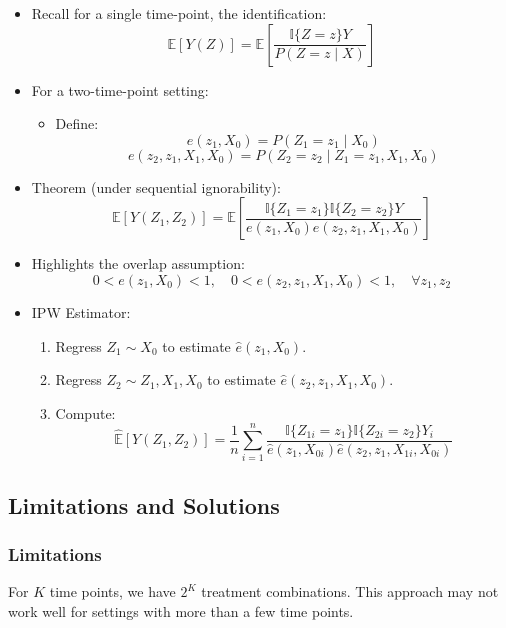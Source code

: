 \begin{itemize}
    \item Recall for a single time-point, the identification:
    \[
    \mathbb{E}[Y(Z)] = \mathbb{E}\left[\frac{\mathbb{I}\{Z = z\} Y}{P(Z = z \mid X)}\right]
    \]

    \item For a two-time-point setting:
    \begin{itemize}
        \item Define:
        \[
        e(z_1, X_0) = P(Z_1 = z_1 \mid X_0)
        \]
        \[
        e(z_2, z_1, X_1, X_0) = P(Z_2 = z_2 \mid Z_1 = z_1, X_1, X_0)
        \]
    \end{itemize}

    \item Theorem (under sequential ignorability):
    \[
    \mathbb{E}[Y(Z_1, Z_2)] = \mathbb{E}\left[\frac{\mathbb{I}\{Z_1 = z_1\} \mathbb{I}\{Z_2 = z_2\} Y}{e(z_1, X_0) e(z_2, z_1, X_1, X_0)}\right]
    \]

    \item Highlights the overlap assumption:
    \[
    0 < e(z_1, X_0) < 1, \quad 0 < e(z_2, z_1, X_1, X_0) < 1, \quad \forall z_1, z_2
    \]

    \item IPW Estimator:
    \begin{enumerate}
        \item Regress $Z_1 \sim X_0$ to estimate $\hat{e}(z_1, X_0)$.
        \item Regress $Z_2 \sim Z_1, X_1, X_0$ to estimate $\hat{e}(z_2, z_1, X_1, X_0)$.
        \item Compute:
        \[
        \widehat{\mathbb{E}}[Y(Z_1, Z_2)] = \frac{1}{n} \sum_{i=1}^n \frac{\mathbb{I}\{Z_{1i} = z_1\} \mathbb{I}\{Z_{2i} = z_2\} Y_i}{\hat{e}(z_1, X_{0i}) \hat{e}(z_2, z_1, X_{1i}, X_{0i})}
        \]
    \end{enumerate}
\end{itemize}



\subsection*{Limitations and Solutions}

\subsubsection*{Limitations}
For $K$ time points, we have $2^K$ treatment combinations. This approach may not work well for settings with more than a few time points.

